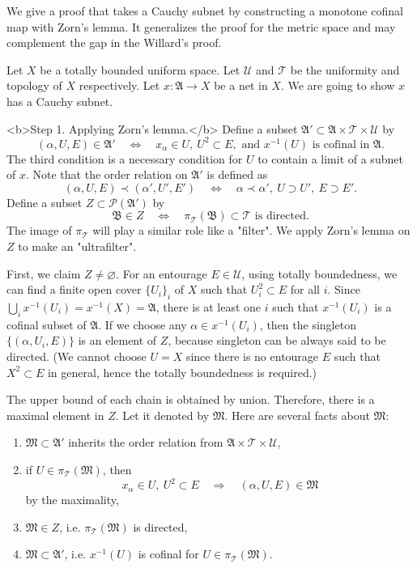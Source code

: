 \documentclass[11pt]{amsart}
\begin{document}
We give a proof that takes a Cauchy subnet by constructing a monotone cofinal map with Zorn's lemma.
It generalizes the proof for the metric space and may complement the gap in the Willard's proof.

\begin{pf}
Let $X$ be a totally bounded uniform space.
Let $\mathcal{U}$ and $\mathcal{T}$ be the uniformity and topology of $X$ respectively.
Let $x:\mathfrak{A}\to X$ be a net in $X$.
We are going to show $x$ has a Cauchy subnet.

<b>Step 1. Applying Zorn's lemma.</b>
Define a subset $\mathfrak{A}'\subset\mathfrak{A}\times\mathcal{T}\times\mathcal{U}$ by
\[(\alpha,U,E)\in\mathfrak{A}'\quad\Leftrightarrow\quad x_\alpha\in U,\ U^2\subset E,\text{ and }x^{-1}(U)\text{ is cofinal in }\mathfrak{A}.\]
The third condition is a necessary condition for $U$ to contain a limit of a subnet of $x$.
Note that the order relation on $\mathfrak{A}'$ is defined as
\[(\alpha,U,E)\prec(\alpha',U',E')\quad\Leftrightarrow\quad \alpha\prec\alpha',\ U\supset U',\ E\supset E'.\]
Define a subset $Z\subset\mathcal{P}(\mathfrak{A}')$ by
\[\mathfrak{B}\in Z\quad\Leftrightarrow\quad\pi_\mathcal{T}(\mathfrak{B})\subset\mathcal{T}\text{ is directed}.\]
The image of $\pi_\mathcal{T}$ will play a similar role like a "filter".
We apply Zorn's lemma on $Z$ to make an "ultrafilter".

First, we claim $Z\ne\varnothing$.
For an entourage $E\in\mathcal{U}$, using totally boundedness, we can find a finite open cover $\{U_i\}_i$ of $X$ such that $U_i^2\subset E$ for all $i$.
Since $\bigcup_ix^{-1}(U_i)=x^{-1}(X)=\mathfrak{A}$, there is at least one $i$ such that $x^{-1}(U_i)$ is a cofinal subset of $\mathfrak{A}$.
If we choose any $\alpha\in x^{-1}(U_i)$, then the singleton $\{(\alpha,U_i,E)\}$ is an element of $Z$, because singleton can be always said to be directed.
(We cannot choose $U=X$ since there is no entourage $E$ such that $X^2\subset E$ in general, hence the totally boundedness is required.)

The upper bound of each chain is obtained by union.
Therefore, there is a maximal element in $Z$.
Let it denoted by $\mathfrak{M}$.
Here are several facts about $\mathfrak{M}$:
\begin{enumerate}
\item $\mathfrak{M}\subset\mathfrak{A}'$ inherits the order relation from $\mathfrak{A}\times\mathcal{T}\times\mathcal{U}$,
\item if $U\in\pi_\mathcal{T}(\mathfrak{M})$, then \[x_\alpha\in U,\ U^2\subset E\quad\Rightarrow\quad(\alpha,U,E)\in\mathfrak{M}\] by the maximality,
\item $\mathfrak{M}\in Z$, i.e. $\pi_\mathcal{T}(\mathfrak{M})$ is directed,
\item $\mathfrak{M}\subset\mathfrak{A}'$, i.e. $x^{-1}(U)$ is cofinal for $U\in\pi_\mathcal{T}(\mathfrak{M})$.
\end{enumerate}


\end{pf}
\end{document}
